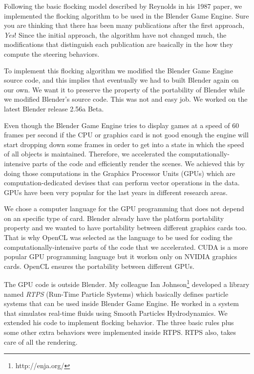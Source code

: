 Following the basic flocking model described by Reynolds in his 1987 paper, we implemented the flocking algorithm to be used in the Blender Game Engine. Sure you are thinking that there has been many publications after the first approach, \textit{Yes}!  Since the initial approach, the algorithm have not changed much, the modifications that distinguish each publication are basically in the how they compute the steering behaviors.

To implement this flocking algorithm we modified the Blender Game Engine source code, and this implies that eventually we had to built Blender again on our own. We want it to preserve the property of the portability of Blender while we modified Blender's source code. This was not and easy job. We worked on the latest Blender release 2.56a Beta. 


Even though the Blender Game Engine tries to display games at a speed of 60 frames per second\cite{bookGameKit2} if the CPU or graphics card is not good enough the engine will start dropping down some frames in order to get into a state in which the speed of all objects is maintained. Therefore, we accelerated the computationally-intensive parts of the code and efficiently render the scenes. We achieved this by doing those computations in the Graphics Processor Units (GPUs) which are computation-dedicated devises that can perform vector operations in the data. GPUs have been very popular for the last years in different research areas. 

We chose a computer language for the GPU programming that does not depend on an specific type of card. Blender already have the platform portability property  and we wanted to have portability between different graphics cards too. That is why OpenCL was selected as the language to be used for coding the computationally-intensive parts of the code that we accelerated. CUDA is a more popular GPU programming language but it worksn only on NVIDIA graphics cards. OpenCL ensures the portability between different GPUs.


The GPU code is outside Blender. My colleague Ian Johnson\footnote{http://enja.org/} developed a library named \textit{RTPS} (Run-Time Particle Systems) which basically defines particle systems that can be used inside Blender Game Engine. He worked in a system that simulates real-time fluids using Smooth Particles Hydrodynamics. We extended his code to implement flocking behavior. The three basic rules plus some other extra behaviors were implemented inside RTPS. RTPS also, takes care of all the rendering.

